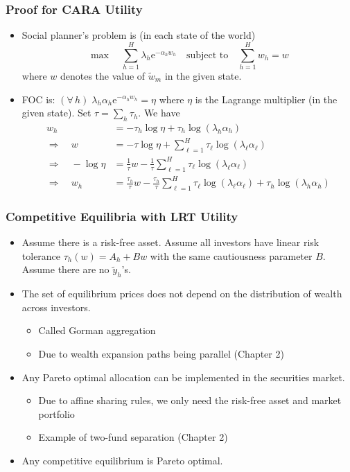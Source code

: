 \documentclass[10pt]{beamer}
\newcommand{\bi}{\begin{itemize}}
\newcommand{\ei}{\end{itemize}}
\newcommand{\im}{\item}
\newcommand{\E}{\mathrm{e}}
\newcommand{\bfr}{\begin{frame}}
\newcommand{\tw}{\tilde{w}}
\newcommand{\ty}{\tilde{y}}
\begin{document}
  \bfr\frametitle{Proof for CARA Utility}
  \bi 
  \im
  Social planner's problem is (in each state of the world)
  $$\max \quad \sum_{h=1}^H \lambda_h \E^{-\alpha_h w_h} \quad \text{subject to} \quad \sum_{h=1}^H w_h = w$$
  where $w$ denotes the value of $\tw_m$ in the given state.
  
  \im FOC is:  $(\forall\, h) \; \lambda_h\alpha_h\E^{-\alpha_hw_h} = \eta$ where $\eta$ is the Lagrange multiplier (in the given state).   Set $\tau = \sum_h \tau_h$.   We have
  \begin{align*}
  w_h& =  -{\tau _h}\log \eta + \tau _h\log (\lambda_h\alpha_h)\label{3_wh}\\
   \Rightarrow \quad 
   w & = - \tau \log \eta + \sum_{\ell =1}^H \tau _\ell \log (\lambda_\ell \alpha_\ell )\\
   \Rightarrow \quad -\log \eta & =
  \frac{1}{\tau }w - \frac{1}{\tau }\sum_{\ell =1}^H \tau _\ell \log (\lambda_\ell \alpha_\ell )\\
   \Rightarrow \quad 
  w_h& =\frac{\tau _h}{\tau }w -\frac{\tau _h}{\tau }\sum_{\ell =1}^H \tau _\ell \log (\lambda_\ell \alpha_\ell ) + \tau _h\log(\lambda_h\alpha_h)
  \end{align*}
  \ei 
  \end{frame}
  
  \bfr\frametitle{Competitive Equilibria with LRT Utility}
  \bi
  \im Assume there is a risk-free asset.  Assume all investors have linear risk tolerance $\tau_h(w) = A_h + Bw$ with the same cautiousness parameter $B$.  Assume there are no $\ty_h$'s.
  \im The set of equilibrium prices does not depend on the distribution of wealth across investors.
  \bi
  \im Called Gorman aggregation
  \im Due to wealth expansion paths being parallel (Chapter 2)
  \ei
  \im Any Pareto optimal allocation can be implemented in the securities market.
  \bi
  \im Due to affine sharing rules, we only need the risk-free asset and market portfolio
  \im Example of two-fund separation (Chapter 2)
  \ei
  \im Any competitive equilibrium is Pareto optimal.
  \ei
  \end{frame}
  
  
\end{document}
